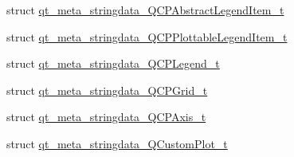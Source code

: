 \begin{DoxyCompactItemize}
\item 
struct \hyperlink{a00067_d9/dd0/a00191}{qt\+\_\+meta\+\_\+stringdata\+\_\+\+Q\+C\+P\+Abstract\+Legend\+Item\+\_\+t}
\item 
struct \hyperlink{a00067_d3/de5/a00209}{qt\+\_\+meta\+\_\+stringdata\+\_\+\+Q\+C\+P\+Plottable\+Legend\+Item\+\_\+t}
\item 
struct \hyperlink{a00067_dc/d31/a00208}{qt\+\_\+meta\+\_\+stringdata\+\_\+\+Q\+C\+P\+Legend\+\_\+t}
\item 
struct \hyperlink{a00067_de/db1/a00197}{qt\+\_\+meta\+\_\+stringdata\+\_\+\+Q\+C\+P\+Grid\+\_\+t}
\item 
struct \hyperlink{a00067_dd/df4/a00193}{qt\+\_\+meta\+\_\+stringdata\+\_\+\+Q\+C\+P\+Axis\+\_\+t}
\item 
struct \hyperlink{a00067_dd/ded/a00211}{qt\+\_\+meta\+\_\+stringdata\+\_\+\+Q\+Custom\+Plot\+\_\+t}
\end{DoxyCompactItemize}
